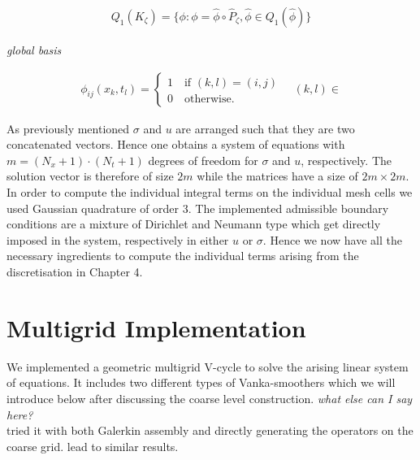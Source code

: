 \documentclass[../draft_1.tex]{subfiles}
\begin{document}
\begin{ceqn}
	\begin{equation}
	\begin{aligned}
Q_1(K_{\zeta}) = \{\phi : \phi = \hat{\phi} \circ \hat{P}_{\zeta}, \hat{\phi} \in Q_1(\hat{\phi})\}
	\end{aligned}
	\end{equation}
\end{ceqn}

\textit{global basis}
\begin{ceqn}
	\begin{equation}
	\begin{aligned}
	\phi_{ij}(x_k, t_l) = \begin{cases} 1 \quad \text{if } (k,l) = (i,j)  \\ 0 \quad \text{otherwise.} \end{cases} \quad (k, l) \in 
	\end{aligned}
	\end{equation}
\end{ceqn}

As previously mentioned $\sigma$ and $u$ are arranged such that they are two concatenated vectors. Hence one obtains a system of equations with $m = (N_x + 1 )\cdot (N_t + 1)$ degrees of freedom for $\sigma$ and $u$, respectively. The solution vector is therefore of size $2m$ while the matrices have a size of $2m \times 2m$. In order to compute the individual integral terms on the individual mesh cells we used Gaussian quadrature of order 3. The implemented admissible boundary conditions are a mixture of Dirichlet and Neumann type which get directly imposed in the system, respectively in either $u$ or $\sigma$. Hence we now have all the necessary ingredients to compute the individual terms arising from the discretisation in Chapter 4. 

\section{Multigrid Implementation}
We implemented a geometric multigrid V-cycle to solve the arising linear system of equations. It includes two different types of Vanka-smoothers which we will introduce below after discussing the coarse level construction.
 \textit{what else can I say here?}
\smallskip
\\
tried it with both Galerkin assembly and directly generating the operators on the coarse grid. lead to similar results. 
\end{document}
